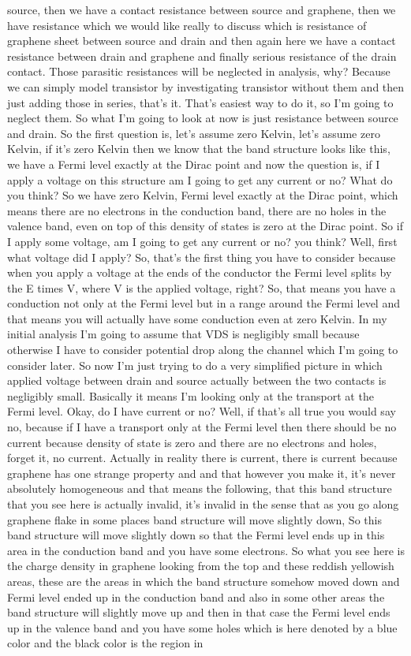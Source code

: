 source, then we have a contact resistance between source and graphene, then we have resistance which we would like really to discuss which is resistance of graphene sheet between source and drain and then again here we have a contact resistance between drain and graphene and finally serious resistance of the drain contact. Those parasitic resistances will be neglected in analysis, why? Because we can simply model transistor by investigating transistor without them and then just adding those in series, that's it. That's easiest way to do it, so I'm going to neglect them. So what I'm going to look at now is just resistance between source and drain. So the first question is, let's assume zero Kelvin, let's assume zero Kelvin, if it's zero Kelvin then we know that the band structure looks like this, we have a Fermi level exactly at the Dirac point and now the question is, if I apply a voltage on this structure am I going to get any current or no? What do you think? So we have zero Kelvin, Fermi level exactly at the Dirac point, which means there are no electrons in the conduction band, there are no holes in the valence band, even on top of this density of states is zero at the Dirac point. So if I apply some voltage, am I going to get any current or no? you think? Well, first what voltage did I apply? So, that's the first thing you have to consider because when you apply a voltage at the ends of the conductor the Fermi level splits by the E times V, where V is the applied voltage, right? So, that means you have a conduction not only at the Fermi level but in a range around the Fermi level and that means you will actually have some conduction even at zero Kelvin. In my initial analysis I'm going to assume that VDS is negligibly small because otherwise I have to consider potential drop along the channel which I'm going to consider later. So now I'm just trying to do a very simplified picture in which applied voltage between drain and source actually between the two contacts is negligibly small. Basically it means I'm looking only at the transport at the Fermi level. Okay, do I have current or no? Well, if that's all true you would say no, because if I have a transport only at the Fermi level then there should be no current because density of state is zero and there are no electrons and holes, forget it, no current. Actually in reality there is current, there is current because graphene has one strange property and and that however you make it, it's never absolutely homogeneous and that means the following, that this band structure that you see here is actually invalid, it's invalid in the sense that as you go along graphene flake in some places band structure will move slightly down, So this band structure will move slightly down so that the Fermi level ends up in this area in the conduction band and you have some electrons. So what you see here is the charge density in graphene looking from the top and these reddish yellowish areas, these are the areas in which the band structure somehow moved down and Fermi level ended up in the conduction band and also in some other areas the band structure will slightly move up and then in that case the Fermi level ends up in the valence band and you have some holes which is here denoted by a blue color and the black color is the region in 